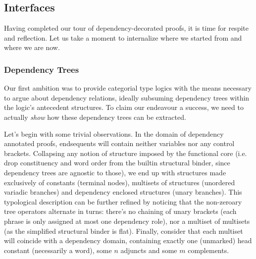 \subsection{Interfaces}
Having completed our tour of dependency-decorated proofs, it is time for respite and reflection.
Let us take a moment to internalize where we started from and where we are now.

\subsubsection{Dependency Trees}
Our first ambition was to provide categorial type logics with the means necessary to argue about dependency relations, ideally subsuming dependency trees within the logic's antecedent structures. 
To claim our endeavour a success, we need to actually \textit{show} how these dependency trees can be extracted.

Let's begin with some trivial observations.
In the domain of dependency annotated proofs, endsequents will contain neither variables nor any control brackets.
Collapsing any notion of structure imposed by the functional core (i.e. drop constituency and word order from the builtin structural binder, since dependency trees are agnostic to those), we end up with structures made exclusively of constants (terminal nodes), multisets of structures (unordered variadic branches) and dependency enclosed structures (unary branches).
This typological description can be further refined by noticing that the non-zeroary tree operators alternate in turns: there's no chaining of unary brackets (each phrase is only assigned at most one dependency role), nor a multiset of multisets (as the simplified structural binder is flat).
Finally, consider that each multiset will coincide with a dependency domain, containing exactly one (unmarked) head constant (necessarily a word), some $n$ adjuncts and some $m$ complements.

